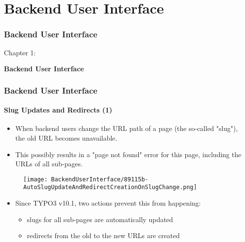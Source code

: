 %

\section{Backend User Interface}
\begin{frame}[fragile]
	\frametitle{Backend User Interface}

	\begin{center}\huge{Chapter 1:}\end{center}
	\begin{center}\huge{\color{typo3darkgrey}\textbf{Backend User Interface}}\end{center}

\end{frame}


\begin{frame}[fragile]
	\frametitle{Backend User Interface}
	\framesubtitle{Slug Updates and Redirects (1)}

	\begin{itemize}
		\item When backend users change the URL path of a page (the so-called "slug"),
			the old URL becomes unavailable.
		\item This possibly results in a "page not found" error for this page,
			including the URLs of all sub-pages.
	\end{itemize}

	\begin{figure}
		\texttt{[image: BackendUserInterface/89115b-AutoSlugUpdateAndRedirectCreationOnSlugChange.png]}
	\end{figure}

	\begin{itemize}
		\item Since TYPO3 v10.1, two actions prevent this from happening:

			\begin{itemize}
				\item slugs for all sub-pages are automatically updated
				\item redirects from the old to the new URLs are created
			\end{itemize}

	\end{itemize}

\end{frame}

